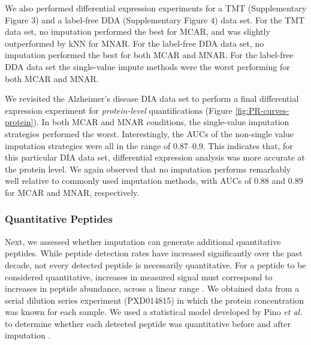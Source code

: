 \documentclass{article}
\begin{document}
We also performed differential expression experiments for a TMT (Supplementary Figure 3) and a label-free DDA (Supplementary Figure 4) data set. For the TMT data set, no imputation performed the best for MCAR, and was slightly outperformed by kNN for MNAR. For the label-free DDA data set, no imputation performed the best for both MCAR and MNAR. For the label-free DDA data set the single-value impute methods were the worst performing for both MCAR and MNAR.

We revisited the Alzheimer's disease DIA data set to perform a final differential expression experiment for \textit{protein-level} quantifications (Figure \ref{fig:PR-curves-protein}). In both MCAR and MNAR conditions, the single-value imputation strategies performed the worst. Interestingly, the AUCs of the non-single value imputation strategies were all in the range of 0.87--0.9. This indicates that, for this particular DIA data set, differential expression analysis was more accurate at the protein level. We again observed that no imputation performs remarkably well relative to commonly used imputation methods, with AUCs of 0.88 and 0.89 for MCAR and MNAR, respectively.

\subsubsection{Quantitative Peptides}

Next, we assessed whether imputation can generate additional quantitative peptides. While peptide detection rates have increased significantly over the past decade, not every detected peptide is necessarily quantitative. For a peptide to be considered quantitative, increases in measured signal must correspond to increases in peptide abundance, across a linear range \cite{matrix-matched-calib}. We obtained data from a serial dilution series experiment (PXD014815) in which the protein concentration was known for each sample. We used a statistical model developed by Pino \textit{et al.} to determine whether each detected peptide was quantitative before and after imputation \cite{matrix-matched-calib}.
\end{document}
